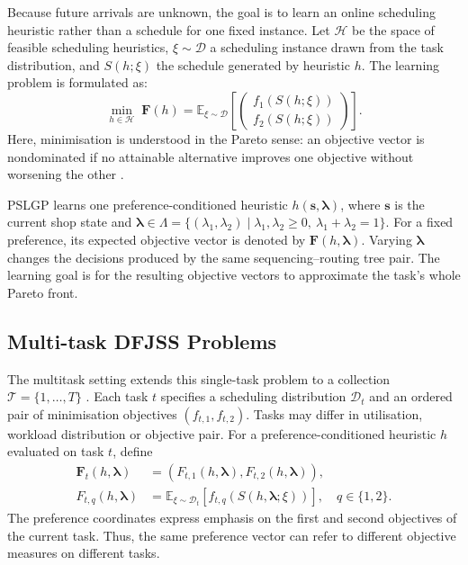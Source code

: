 \documentclass[10pt,journal]{IEEEtran}
\begin{document}
Because future arrivals are unknown, the goal is to learn an online scheduling heuristic rather than a schedule for one fixed instance. Let $\mathcal{H}$ be the space of feasible scheduling heuristics, $\xi\sim\mathcal{D}$ a scheduling instance drawn from the task distribution, and $S(h;\xi)$ the schedule generated by heuristic $h$. The learning problem is formulated as:
\begin{equation}
\min_{h\in\mathcal{H}}\;
\mathbf{F}(h)
=
\mathbb{E}_{\xi\sim\mathcal{D}}
\left[
\begin{pmatrix}
f_1(S(h;\xi))\\
f_2(S(h;\xi))
\end{pmatrix}
\right].
\label{eq:single-task-modfjss}
\end{equation}
Here, minimisation is understood in the Pareto sense: an objective vector is nondominated if no attainable alternative improves one objective without worsening the other \cite{zychowski2026multiobjective}.

PSLGP learns one preference-conditioned heuristic $h(\mathbf{s},\boldsymbol{\lambda})$, where $\mathbf{s}$ is the current shop state and
$\boldsymbol{\lambda}\in\Lambda=\{(\lambda_1,\lambda_2)\mid\lambda_1,\lambda_2\geq0,\ \lambda_1+\lambda_2=1\}$.
For a fixed preference, its expected objective vector is denoted by $\mathbf{F}(h,\boldsymbol{\lambda})$. Varying $\boldsymbol{\lambda}$ changes the decisions produced by the same sequencing--routing tree pair. The learning goal is for the resulting objective vectors to approximate the task's whole Pareto front.

\subsection{Multi-task DFJSS Problems}
The multitask setting extends this single-task problem to a collection $\mathcal{T}=\{1,\ldots,T\}$ \cite{chen2025optimizing}. Each task $t$ specifies a scheduling distribution $\mathcal{D}_t$ and an ordered pair of minimisation objectives $(f_{t,1},f_{t,2})$. Tasks may differ in utilisation, workload distribution or objective pair. For a preference-conditioned heuristic $h$ evaluated on task $t$, define
\begin{equation}
\begin{aligned}
\mathbf{F}_t(h,\boldsymbol{\lambda})
&=
\left(
F_{t,1}(h,\boldsymbol{\lambda}),
F_{t,2}(h,\boldsymbol{\lambda})
\right),\\
F_{t,q}(h,\boldsymbol{\lambda})
&=
\mathbb{E}_{\xi\sim\mathcal{D}_t}
\left[f_{t,q}(S(h,\boldsymbol{\lambda};\xi))\right],
\quad q\in\{1,2\}.
\end{aligned}
\label{eq:multitask-dfjss}
\end{equation}
The preference coordinates express emphasis on the first and second objectives of the current task. Thus, the same preference vector can refer to different objective measures on different tasks.
\end{document}
